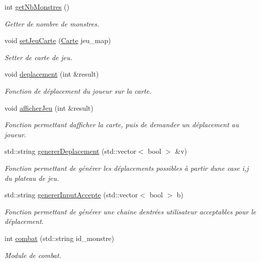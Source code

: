 \begin{DoxyCompactItemize}
int \hyperlink{classjeu_ae172cfaf3e5c97e1576dc4069d48ec94}{get\+Nb\+Monstres} ()
\begin{DoxyCompactList}\small\item\em Getter de nombre de monstres. \end{DoxyCompactList}\item 
void \hyperlink{classjeu_a53cb5e2a1c7e0925aca09885ff959efc}{set\+Jeu\+Carte} (\hyperlink{class_carte}{Carte} jeu\+\_\+map)
\begin{DoxyCompactList}\small\item\em Setter de carte de jeu. \end{DoxyCompactList}\item 
void \hyperlink{classjeu_a852b0a8b2d17f0af120c6798861ef806}{deplacement} (int \&result)
\begin{DoxyCompactList}\small\item\em Fonction de déplacement du joueur sur la carte. \end{DoxyCompactList}\item 
void \hyperlink{classjeu_a834e8a14bd0324c88b2de777a6bdf30f}{afficher\+Jeu} (int \&result)
\begin{DoxyCompactList}\small\item\em Fonction permettant d\textquotesingle{}afficher la carte, puis de demander un déplacement au joueur. \end{DoxyCompactList}\item 
std\+::string \hyperlink{classjeu_a58d74300f8d64b3d3cd151e0838ef232}{generer\+Deplacement} (std\+::vector$<$ bool $>$ \&v)
\begin{DoxyCompactList}\small\item\em Fonction permettant de générer les déplacements possibles à partir d\textquotesingle{}une case {\ttfamily i,j} du plateau de jeu. \end{DoxyCompactList}\item 
std\+::string \hyperlink{classjeu_ae186e98661e72378c9e659ffcf7a7deb}{generer\+Input\+Accepte} (std\+::vector$<$ bool $>$ b)
\begin{DoxyCompactList}\small\item\em Fonction permettant de générer une chaine d\textquotesingle{}entrées utilisateur acceptables pour le déplacement. \end{DoxyCompactList}\item 
int \hyperlink{classjeu_aa96615463266652e0bdc685c9afe5cfe}{combat} (std\+::string id\+\_\+monstre)
\begin{DoxyCompactList}\small\item\em Module de combat. \end{DoxyCompactList}\item 

\end{DoxyCompactItemize}

